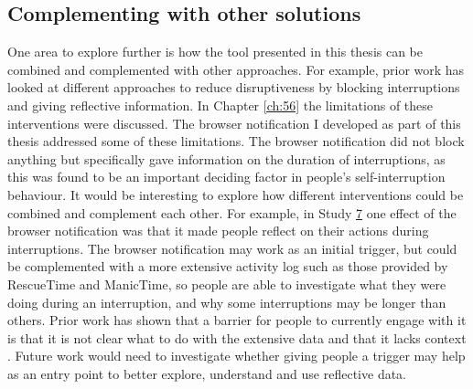 
\subsection{Complementing with other solutions}
One area to explore further is how the tool presented in this thesis can be combined and complemented with other approaches. For example, prior work has looked at different approaches to reduce disruptiveness by blocking interruptions and giving reflective information. In Chapter \ref{ch:56} the limitations of these interventions were discussed. The browser notification I developed as part of this thesis addressed some of these limitations. The browser notification did not block anything but specifically gave information on the duration of interruptions, as this was found to be an important deciding factor in people's self-interruption behaviour. It would be interesting to explore how different interventions could be combined and complement each other. For example, in Study \hyperref[st:Study7]{7} one effect of the browser notification was that it made people reflect on their actions during interruptions. The browser notification may work as an initial trigger, but could be complemented with a more extensive activity log such as those provided by RescueTime and ManicTime, so people are able to investigate what they were doing during an interruption, and why some interruptions may be longer than others. Prior work has shown that a barrier for people to currently engage with it is that it is not clear what to do with the extensive data and that it lacks context \citep{Collins2014}. Future work would need to investigate whether giving people a trigger may help as an entry point to better explore, understand and use  reflective data. 

